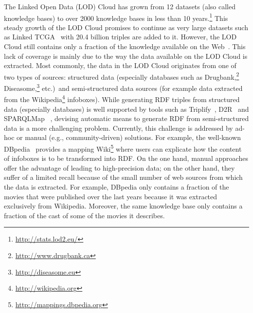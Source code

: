 The Linked Open Data (LOD) Cloud has grown from 12 datasets (also called knowledge bases) to over 2000 knowledge bases in less than 10 years.\footnote{\url{http://stats.lod2.eu/}}
This steady growth of the LOD Cloud promises to continue as very large datasets such as  Linked TCGA~\cite{SAL+13a} with 20.4 billion triples are added to it. However, the LOD Cloud still contains only a fraction of the knowledge available on the Web~\cite{GER+13}. This lack of coverage is mainly due to the way the data available on the LOD Cloud is extracted. Most commonly, the data in the LOD Cloud originates from one of two types of sources: structured data (especially databases such as Drugbank,\footnote{\url{http://www.drugbank.ca}} Diseasome,\footnote{\url{http://diseasome.eu}} etc.)~and semi-structured data sources (for example data extracted from the Wikipedia\footnote{\url{http://wikipedia.org}} infoboxes). While generating RDF triples from structured data (especially databases) is well supported by tools such as Triplify~\cite{DBLP:dblp_conf/www/AuerDLHA09}, D2R~\cite{Bizer04} and SPARQLMap~\cite{DBLP:conf/aswc/UnbehauenSA12}
, devising automatic means to generate RDF from semi-structured data is a more challenging  problem. 
Currently, this challenge is addressed by ad-hoc or manual (e.g., community-driven) solutions. 
For example, the well-known DBpedia~\cite{DBLP:conf/semweb/AuerBKLCI07} provides a mapping Wiki\footnote{\url{http://mappings.dbpedia.org}} where users can explicate how the content of infoboxes is to be transformed into RDF. On the one hand, manual approaches offer the advantage of leading to high-precision data; on the other hand, they suffer of a limited recall because of the small number of web sources from which the data is extracted. For example, DBpedia only contains a fraction of the movies that were published over the last years because it was extracted exclusively from Wikipedia.
Moreover, the same knowledge base only contains a fraction of the cast of some of the movies it describes.

